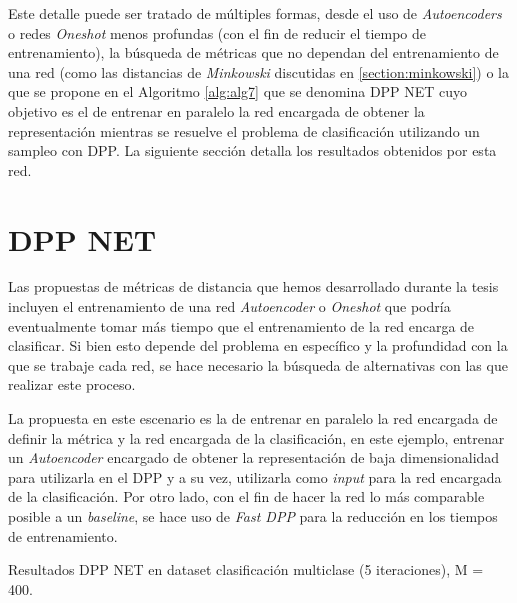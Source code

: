 \vspace{0.2cm}

Este detalle puede ser tratado de múltiples formas, desde el uso de \textit{Autoencoders} o redes \textit{Oneshot} menos profundas (con el fin de reducir el tiempo de entrenamiento), la búsqueda de métricas que no dependan del entrenamiento de una red (como las distancias de \textit{Minkowski} discutidas en \ref{section:minkowski}) o la que se propone en el Algoritmo \ref{alg:alg7} que se denomina DPP NET cuyo objetivo es el de entrenar en paralelo la red encargada de obtener la representación mientras se resuelve el problema de clasificación utilizando un sampleo con DPP. La siguiente sección detalla los resultados obtenidos por esta red. 


\section{DPP NET}

Las propuestas de métricas de distancia que hemos desarrollado durante la tesis incluyen el entrenamiento de una red \textit{Autoencoder} o \textit{Oneshot} que podría eventualmente tomar más tiempo que el entrenamiento de la red encarga de clasificar. Si bien esto depende del problema en específico y la profundidad con la que se trabaje cada red, se hace necesario la búsqueda de alternativas con las que realizar este proceso. 

\vspace{0.2cm}

La propuesta en este escenario es la de entrenar en paralelo la red encargada de definir la métrica y la red encargada de la clasificación, en este ejemplo, entrenar un \textit{Autoencoder} encargado de obtener la representación de baja dimensionalidad para utilizarla en el DPP y a su vez, utilizarla como \textit{input} para la red encargada de la clasificación. Por otro lado, con el fin de hacer la red lo más comparable posible a un \textit{baseline}, se hace uso de \textit{Fast DPP} para la reducción en los tiempos de entrenamiento.

\begin{images}[\label{fig:nd_dpp_net}]{\centering Resultados DPP NET en dataset clasificación multiclase (5 iteraciones), M = 400.}
\end{images}

